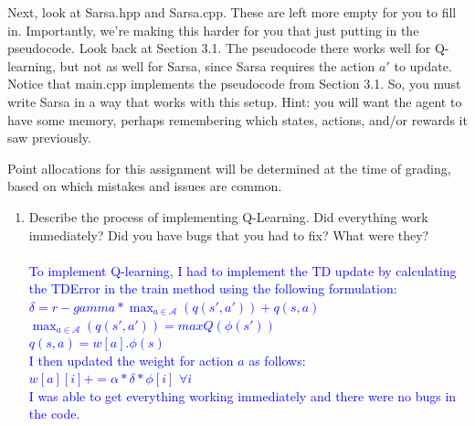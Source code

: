 \documentclass[]{article}
\begin{document}
Next, look at Sarsa.hpp and Sarsa.cpp. These are left more empty for you to fill in. Importantly, we're making this harder for you that just putting in the pseudocode. Look back at Section 3.1. The pseudocode there works well for Q-learning, but not as well for Sarsa, since Sarsa requires the action $a'$ to update. Notice that main.cpp implements the pseudocode from Section 3.1. So, you must write Sarsa in a way that works with this setup. Hint: you will want the agent to have some memory, perhaps remembering which states, actions, and/or rewards it saw previously.

Point allocations for this assignment will be determined at the time of grading, based on which mistakes and issues are common.

\begin{enumerate}
    \item Describe the process of implementing Q-Learning. Did everything work immediately? Did you have bugs that you had to fix? What were they?
    \\\\
    \textcolor{blue}{
		To implement Q-learning, I had to implement the TD update by calculating the TDError in the train method using the following formulation:\\
		$\delta = r - gamma*\max_{a \in \mathcal{A}}(q(s',a')) + q(s,a)$\\
		$\max_{a \in \mathcal{A}}(q(s',a')) = maxQ(\phi(s'))$ \\
		$q(s,a) = w[a] . \phi(s)$\\
		I then updated the weight for action $a$ as follows:\\
		$w[a][i] += \alpha*\delta*\phi[i]$ $\forall i $\\
		I was able to get everything working immediately and there were no bugs in the code.
	}


\end{enumerate}
\end{document}
